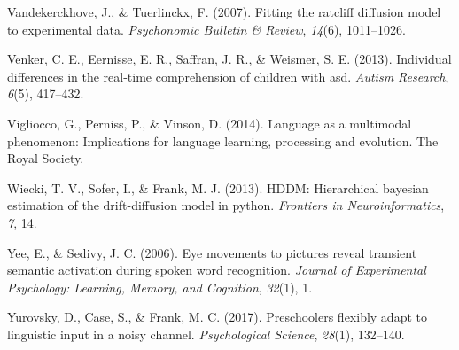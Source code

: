 \documentclass[english,floatsintext,man]{apa6}
\begin{document}
\leavevmode\hypertarget{ref-vandekerckhove2007fitting}{}%
Vandekerckhove, J., \& Tuerlinckx, F. (2007). Fitting the ratcliff
diffusion model to experimental data. \emph{Psychonomic Bulletin \&
Review}, \emph{14}(6), 1011--1026.

\leavevmode\hypertarget{ref-venker2013individual}{}%
Venker, C. E., Eernisse, E. R., Saffran, J. R., \& Weismer, S. E.
(2013). Individual differences in the real-time comprehension of
children with asd. \emph{Autism Research}, \emph{6}(5), 417--432.

\leavevmode\hypertarget{ref-vigliocco2014language}{}%
Vigliocco, G., Perniss, P., \& Vinson, D. (2014). Language as a
multimodal phenomenon: Implications for language learning, processing
and evolution. The Royal Society.

\leavevmode\hypertarget{ref-wiecki2013hddm}{}%
Wiecki, T. V., Sofer, I., \& Frank, M. J. (2013). HDDM: Hierarchical
bayesian estimation of the drift-diffusion model in python.
\emph{Frontiers in Neuroinformatics}, \emph{7}, 14.

\leavevmode\hypertarget{ref-yee2006eye}{}%
Yee, E., \& Sedivy, J. C. (2006). Eye movements to pictures reveal
transient semantic activation during spoken word recognition.
\emph{Journal of Experimental Psychology: Learning, Memory, and
Cognition}, \emph{32}(1), 1.

\leavevmode\hypertarget{ref-yurovsky2017preschoolers}{}%
Yurovsky, D., Case, S., \& Frank, M. C. (2017). Preschoolers flexibly
adapt to linguistic input in a noisy channel. \emph{Psychological
Science}, \emph{28}(1), 132--140.
\end{document}
